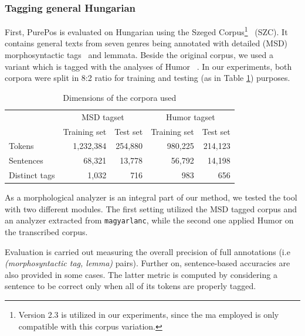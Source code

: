 \subsubsection{Tagging general Hungarian}\label{sec:porepos-gen}

First, PurePos is evaluated on Hungarian using the Szeged Corpus\footnote{Version 2.3 is utilized in our experiments, since the \acrshort{ma} employed is only compatible with this corpus variation.}~\cite{Csendes2004} (SZC). 
It contains general texts from seven genres being annotated with detailed (MSD) morphosyntactic tags~\cite{Erjavec2012} and lemmata.
Beside the original corpus, we used a variant which is tagged with the analyses of Humor ~\cite{Proszeky1994,Novak2003,Proszeky2005}. 
In our experiments, both corpora were split in 8:2 ratio for training and testing (as in Table \ref{tab:szeged-corpus}) purposes. 

\begin{table}[H]
\centering
\caption{Dimensions of the corpora used}
\begin{tabular}{l r r r r}
  \hline
  & \multicolumn{2}{c}{MSD tagset} & \multicolumn{2}{c}{Humor tagset} \\
  &  Training set &  Test set &  Training set &  Test set  \\
  \hline
  Tokens &  1,232,384 &  254,880 &  980,225 &  214,123 \\
  Sentences &  68,321 &  13,778 &  56,792 &  14,198 \\
  Distinct tags &  1,032 &  716 &  983 &  656 \\
  \hline
\end{tabular}
\label{tab:szeged-corpus}
\end{table}

As a morphological analyzer is an integral part of our method, we tested the tool with two different modules. 
The first setting utilized the MSD tagged corpus and an analyzer extracted from \texttt{magyarlanc}, while the second one applied Humor on the transcribed corpus.

Evaluation is carried out measuring the overall precision of full annotations (i.e \emph{(morphosyntactic tag, lemma)} pairs). 
Further on, sentence-based accuracies are also provided in some cases. 
The latter metric is computed by considering a sentence to be correct only when all of its tokens are properly tagged. 

